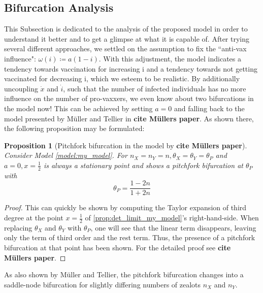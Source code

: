 \documentclass[12pt,a4paper,twoside]{article}
\newtheorem{prop}{Proposition}[section]
\begin{document}
\subsection{Bifurcation Analysis}
This Subsection is dedicated to the analysis of the proposed model in order to understand it better and to get a glimpse at what it is capable of. After trying several different approaches, we settled on the assumption to fix the ``anti-vax influence": $\omega\left(i\right) \coloneqq a\left(1-i\right)$. With this adjustment, the model indicates a tendency towards vaccination for increasing i and a tendency towards not getting vaccinated for decreasing i, which we esteem to be realistic. By additionally uncoupling $\dot{x}$ and $\dot{i}$, such that the number of infected individuals has no more influence on the number of pro-vaxxers, we even know about two bifurcations in the model now! This can be achieved by setting $a = 0$ and falling back to the model presented by M\"uller and Tellier in \textbf{cite M\"ullers paper}. As shown there, the following proposition may be formulated:

\begin{prop}[Pitchfork bifurcation in the model by \textbf{cite M\"ullers paper}]\label{prop:mueller_stat_point}%
	Consider Model \ref{model:my_model}. For $n_X = n_Y = n, \theta_X = \theta_Y = \theta_P$ and $a = 0, x = \frac{1}{2}$ is always a stationary point and shows a pitchfork bifurcation at $\theta_P$ with
	\begin{equation*}
		\theta_P = \frac{1-2n}{1+2n}
	\end{equation*}
\end{prop}
\begin{proof}
	This can quickly be shown by computing the Taylor expansion of third degree at the point $x = \frac{1}{2}$ of \eqref{prop:det_limit_my_model}'s right-hand-side. When replacing $\theta_X$ and $\theta_Y$ with $\theta_P$, one will see that the linear term disappears, leaving only the term of third order and the rest term. Thus, the presence of a pitchfork bifurcation at that point has been shown. For the detailed proof see \textbf{cite M\"ullers paper}.
\end{proof}

As also shown by M\"uller and Tellier, the pitchfork bifurcation changes into a saddle-node bifurcation for slightly differing numbers of zealots $n_X$ and $n_Y$. 
\end{document}
